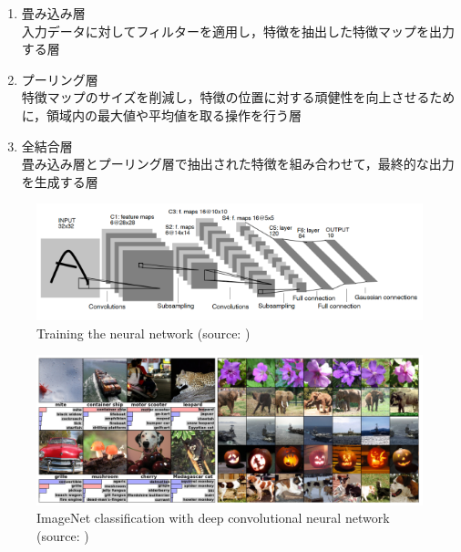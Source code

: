   \begin{enumerate}
    \item 畳み込み層\\
    入力データに対してフィルターを適用し，特徴を抽出した特徴マップを出力する層
    \item プーリング層\\
    特徴マップのサイズを削減し，特徴の位置に対する頑健性を向上させるために，領域内の最大値や平均値を取る操作を行う層
    \item 全結合層\\
    畳み込み層とプーリング層で抽出された特徴を組み合わせて，最終的な出力を生成する層
  \end{enumerate}

  \begin{figure}[h]
    \centering
    \includegraphics[keepaspectratio, scale=0.50] {images/yann_CNN.png}
    \caption[Training the neural network]{Training the neural network (source: \cite{yann1})}
    \label{Fig:yann_CNN}
  \end{figure}

\newpage

  \begin{figure}[h]
    \centering
    \includegraphics[keepaspectratio, scale=0.30] {images/deep_convolutional_neural_networks.png}
    \caption[ImageNet classification with deep convolutional neural network]{ImageNet classification with deep convolutional neural network (source: \cite{alex})}
    \label{Fig:deep_convolutional_neural_networks}
  \end{figure}


\newpage

